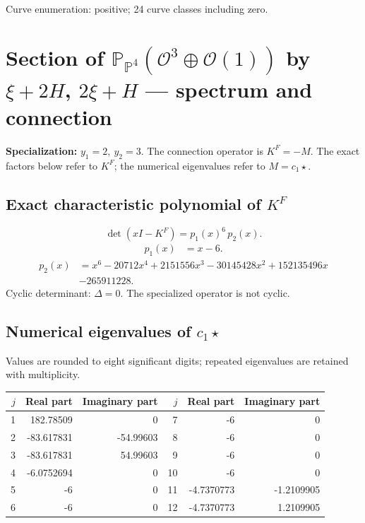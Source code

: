 \documentclass[10pt,a4paper]{article}
\begin{document}
Curve enumeration: positive; 24 curve classes including zero.
\clearpage\section*{Section of $\mathbb P_{\mathbb P^{4}}(\mathcal O^{3}\oplus \mathcal O(1))$ by $\xi +2H$, $2\xi +H$ --- spectrum and connection}
\textbf{Specialization:} $y_1=2,\ y_2=3$. The connection operator is $K^F=-M$. The exact factors below refer to $K^F$; the numerical eigenvalues refer to $M=c_1\star$.
\subsection*{Exact characteristic polynomial of $K^F$}
\[\det(xI-K^F)=p_{1}(x)^{6}\,p_{2}(x).\]
\[\begin{aligned}p_{1}(x)&=x - 6.\end{aligned}\]
\[\begin{aligned}p_{2}(x)&=x^{6} - 20712 x^{4} + 2151556 x^{3} - 30145428 x^{2} + 152135496 x\\&-265911228.\end{aligned}\]
Cyclic determinant: $\Delta=0$. The specialized operator is not cyclic.
\subsection*{Numerical eigenvalues of $c_1\star$}
Values are rounded to eight significant digits; repeated eigenvalues are retained with multiplicity.
\begin{center}\small\begin{tabular}{rrr@{\qquad}rrr}\toprule $j$ & Real part & Imaginary part & $j$ & Real part & Imaginary part\\\midrule
1 & 182.78509 & 0 & 7 & -6 & 0\\
2 & -83.617831 & -54.99603 & 8 & -6 & 0\\
3 & -83.617831 & 54.99603 & 9 & -6 & 0\\
4 & -6.0752694 & 0 & 10 & -6 & 0\\
5 & -6 & 0 & 11 & -4.7370773 & -1.2109905\\
6 & -6 & 0 & 12 & -4.7370773 & 1.2109905\\
\bottomrule\end{tabular}\end{center}
\end{document}
